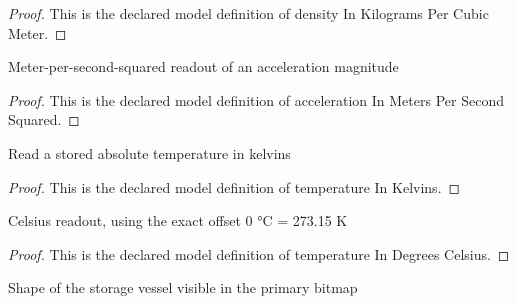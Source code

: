 \begin{proof}
  This is the declared model definition of density In Kilograms Per Cubic Meter.
\end{proof}
\begin{definition}
  \label{def:physics:phyx-mini-0382:phyxminiproblems-problemphyxmini0382-accelerationinmeterspersecondsquared}
  Meter-per-second-squared readout of an acceleration magnitude
\end{definition}
\begin{proof}
  This is the declared model definition of acceleration In Meters Per Second Squared.
\end{proof}
\begin{definition}
  \label{def:physics:phyx-mini-0382:phyxminiproblems-problemphyxmini0382-temperatureinkelvins}
  Read a stored absolute temperature in kelvins
\end{definition}
\begin{proof}
  This is the declared model definition of temperature In Kelvins.
\end{proof}
\begin{definition}
  \label{def:physics:phyx-mini-0382:phyxminiproblems-problemphyxmini0382-temperatureindegreescelsius}
  Celsius readout, using the exact offset 0 °C = 273.15 K
\end{definition}
\begin{proof}
  This is the declared model definition of temperature In Degrees Celsius.
\end{proof}
\begin{definition}
  \label{def:physics:phyx-mini-0382:phyxminiproblems-problemphyxmini0382-tankshape}
  Shape of the storage vessel visible in the primary bitmap
\end{definition}
